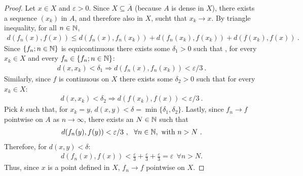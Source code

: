 \begin{questions}


\begin{solution}
  \begin{proof}
Let $x\in X$ and $\varepsilon>0$. Since $X\subseteq\overline{A}$ (because $A$ is dense in $X$), there exists a sequence $(x_k)$ in $A$, and therefore also in $X$, sucht that $x_k\rightarrow x$. By triangle inequality, for all $n\in\mathbb{N}$,
\begin{align*}
d(f_n(x),f(x))\leq d(f_n(x),f_n(x_k))+d(f_n(x_k),f(x_k))+
d(f(x_k),f(x))~.
\end{align*}
Since $\{f_n;n\in\mathbb{N}\}$ is equicontinuous there exists some $\delta_1>0$ such that , for every $x_k\in X$ and every $f_n\in\{f_n;n\in\mathbb{N}\}$:
\begin{align*}
d(x,x_k)<\delta_1\Rightarrow d(f_n(x),f_n(x_k))<\varepsilon /3~.
\end{align*}
Similarly, since $f$ is continuous on $X$ there exists some $\delta _2>0$ such that for every $x_k\in X$:
\begin{align*}
d(x,x_k)<\delta_2\Rightarrow d(f(x_k),f(x))<\varepsilon /3~.
\end{align*}
Pick $k$ such that, for $x_k = y$, $d(x,y)<\delta=\min\{\delta_1,\delta_2\}$. Lastly, since $f_n\rightarrow f$ pointwise on $A$ as $n\rightarrow\infty$, there exists an $N\in\mathbb{N}$ such that
\begin{align*}
d(f_n(y),f(y))<\varepsilon /3~,~~ \forall n\in\mathbb{N},~\text{with } n>N~.
\end{align*}
Therefore, for $d(x,y)<\delta$:
\begin{align*}
d(f_n(x),f(x))< \frac{\varepsilon}{3}+\frac{\varepsilon}{3}+\frac{\varepsilon}{3}=\varepsilon~~\forall n>N.
\end{align*}
Thus, since $x$ is a point defined in $X$, $f_n\rightarrow f$ pointwise on $X$.
  \end{proof}
\end{solution}
\end{questions}